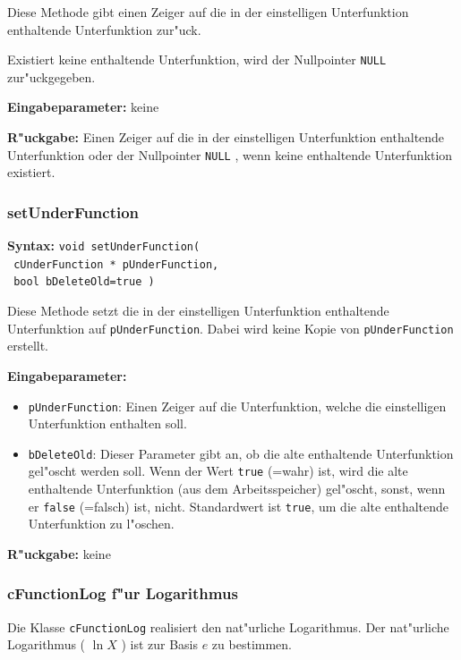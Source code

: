 \bigskip\noindent
Diese Methode gibt einen Zeiger auf die in der einstelligen Unterfunktion enthaltende Unterfunktion zur"uck.

Existiert keine enthaltende Unterfunktion, wird der Nullpointer \verb|NULL| zur"uckgegeben.

\bigskip\noindent
\textbf{Eingabeparameter:} keine

\bigskip\noindent
\textbf{R"uckgabe:} Einen Zeiger auf die in der einstelligen Unterfunktion enthaltende Unterfunktion oder der Nullpointer \verb|NULL| , wenn keine enthaltende Unterfunktion existiert.


\subsubsection{setUnderFunction}

\textbf{Syntax:} \verb|void setUnderFunction(| \\\verb| cUnderFunction * pUnderFunction,| \\\verb| bool bDeleteOld=true )|

\bigskip\noindent
Diese Methode setzt die in der einstelligen Unterfunktion enthaltende Unterfunktion auf \verb|pUnderFunction|. Dabei wird keine Kopie von \verb|pUnderFunction| erstellt.

\bigskip\noindent
\textbf{Eingabeparameter:}
\begin{itemize}
 \item \verb|pUnderFunction|: Einen Zeiger auf die Unterfunktion, welche die einstelligen Unterfunktion enthalten soll.
 \item \verb|bDeleteOld|: Dieser Parameter gibt an, ob die alte enthaltende Unterfunktion gel"oscht werden soll. Wenn der Wert \verb|true| (=wahr) ist, wird die alte enthaltende Unterfunktion (aus dem Arbeitsspeicher) gel"oscht, sonst, wenn er \verb|false| (=falsch) ist, nicht. Standardwert ist \verb|true|, um die alte enthaltende Unterfunktion zu l"oschen.
\end{itemize}

\bigskip\noindent
\textbf{R"uckgabe:} keine


\subsubsection{cFunctionLog f"ur Logarithmus}

Die Klasse \verb|cFunctionLog| realisiert den nat"urliche Logarithmus. Der nat"urliche Logarithmus ( $\ln{X}$ ) ist zur Basis $e$ zu bestimmen.

